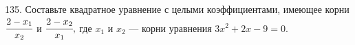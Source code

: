 135. Составьте квадратное уравнение с целыми коэффициентами, имеющее корни $\cfrac{2-x_1}{x_2}$ и $\cfrac{2-x_2}{x_1},$ где $x_1$ и $x_2$ --- корни уравнения $3x^2+2x-9=0.$\\
